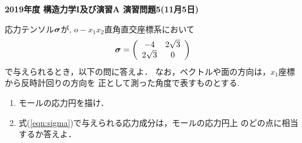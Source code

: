 \documentclass[10pt,a4j]{jarticle}
\newlength{\minitwocolumn}
\begin{document}
\newcommand{\fat}[1]{\mbox{\boldmath $#1$}}
\newcommand{\D}{\partial}
\newcommand{\w}{\omega}
\newcommand{\ga}{\alpha}
\newcommand{\gb}{\beta}
\newcommand{\gx}{\xi}
\newcommand{\gz}{\zeta}
\newcommand{\vhat}[1]{\hat{\fat{#1}}}
\newcommand{\spc}{\vspace{0.7\baselineskip}}
\newcommand{\halfspc}{\vspace{0.3\baselineskip}}

\pagestyle{empty}
\newcommand{\twofig}[2]
 {
   \begin{figure}[here]
     \begin{minipage}[t]{\minitwocolumn}
         \begin{center}   #1
         \end{center}
     \end{minipage}
         \hspace{\columnsep}
     \begin{minipage}[t]{\minitwocolumn}
         \begin{center} #2
         \end{center}
     \end{minipage}
   \end{figure}
 }
\begin{center}
{\Large \bf 2019年度 構造力学I及び演習A 演習問題5(11月5日)} \\
\end{center}
\vspace{15mm}
応力テンソル$\fat{\sigma}$が, $o-x_1x_2$直角直交座標系において
\begin{equation}
	\fat{\sigma}
	=
	\left( 
		\begin{array}{cc}
		-4  & 2\sqrt{3} \\
		2\sqrt{3} & 0 
		\end{array}
	\right)
	\label{eqn:sigma}
\end{equation}
で与えられるとき，以下の問に答えよ．
なお，ベクトルや面の方向は，$x_1$座標から反時計回りの方向を
正として測った角度で表すものとする.
\begin{enumerate}
\item
	モールの応力円を描け．
\item
	式(\ref{eqn:sigma})で与えられる応力成分は，モールの応力円上
	のどの点に相当するか答えよ．
\end{enumerate}
\end{document}
